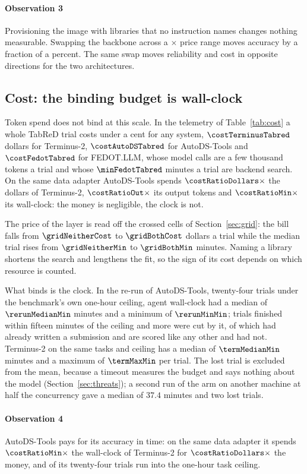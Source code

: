 \paragraph{Observation 3} Provisioning the image with libraries that no
instruction names changes nothing measurable. Swapping the backbone across a
\axPriceSpread$\times$ price range moves accuracy by a fraction of a percent. The same swap moves reliability and cost in
opposite directions for the two architectures.

\subsection{Cost: the binding budget is wall-clock}
\label{sec:cost}



Token spend does not bind at this scale. In the telemetry of
Table~\ref{tab:cost} a whole TabReD trial costs under a cent for any system,
$\costTerminusTabred$ dollars for Terminus-2, $\costAutoDSTabred$ for
AutoDS-Tools and $\costFedotTabred$ for FEDOT.LLM, whose model calls are a few
thousand tokens a trial and whose $\minFedotTabred$ minutes a trial are
backend search. On the same data adapter AutoDS-Tools spends
$\costRatioDollars\times$ the dollars of Terminus-2, $\costRatioOut\times$
its output tokens and $\costRatioMin\times$ its wall-clock: the money is
negligible, the clock is not.

The price of the layer is read off the crossed cells of Section~\ref{sec:grid}:
the bill falls from $\gridNeitherCost$ to $\gridBothCost$ dollars a trial while
the median trial rises from $\gridNeitherMin$ to $\gridBothMin$ minutes. Naming
a library shortens the search and lengthens the fit, so the sign of its cost
depends on which resource is counted.

What binds is the clock. In the re-run of AutoDS-Tools, twenty-four trials
under the benchmark's own one-hour ceiling, agent wall-clock had a median of
$\rerunMedianMin$ minutes and a minimum of $\rerunMinMin$;
\rerunNearCeiling{} trials finished within fifteen minutes of the ceiling and
\rerunCut{} more were cut by it, of which \rerunCutScored{} had already written
a submission and are scored like any other and \rerunLost{} had not.
Terminus-2 on the same tasks and ceiling has a median of $\termMedianMin$
minutes and a maximum of $\termMaxMin$ per trial. The lost trial is excluded
from the mean, because a timeout measures the budget and says nothing about
the model (Section~\ref{sec:threats}); a second run of the arm on another
machine at half the concurrency gave a median of $37.4$ minutes and two lost
trials.

\paragraph{Observation 4} AutoDS-Tools pays for its accuracy in time: on the
same data adapter it spends $\costRatioMin\times$ the wall-clock of
Terminus-2 for $\costRatioDollars\times$ the money, and \rerunCut{} of its
twenty-four trials run into the one-hour task ceiling.
